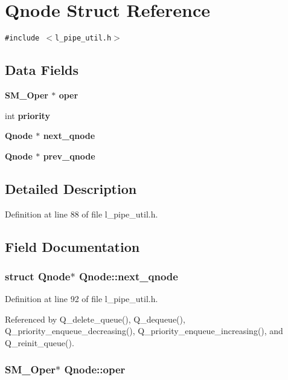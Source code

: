 \section{Qnode Struct Reference}
\label{structQnode}
{\tt \#include $<$l\_\-pipe\_\-util.h$>$}

\subsection*{Data Fields}
\begin{CompactItemize}
\item 
\bf{SM\_\-Oper} $\ast$ \bf{oper}
\item 
int \bf{priority}
\item 
\bf{Qnode} $\ast$ \bf{next\_\-qnode}
\item 
\bf{Qnode} $\ast$ \bf{prev\_\-qnode}
\end{CompactItemize}


\subsection{Detailed Description}




Definition at line 88 of file l\_\-pipe\_\-util.h.

\subsection{Field Documentation}
\subsubsection{\setlength{\rightskip}{0pt plus 5cm}struct \bf{Qnode}$\ast$ \bf{Qnode::next\_\-qnode}}\label{structQnode_baf1d277b57755bb0116b37e5edb5708}




Definition at line 92 of file l\_\-pipe\_\-util.h.

Referenced by Q\_\-delete\_\-queue(), Q\_\-dequeue(), Q\_\-priority\_\-enqueue\_\-decreasing(), Q\_\-priority\_\-enqueue\_\-increasing(), and Q\_\-reinit\_\-queue().
\subsubsection{\setlength{\rightskip}{0pt plus 5cm}\bf{SM\_\-Oper}$\ast$ \bf{Qnode::oper}}\label{structQnode_3aec68cc8a3e9cc21bfa9cdcc705b3f9}




